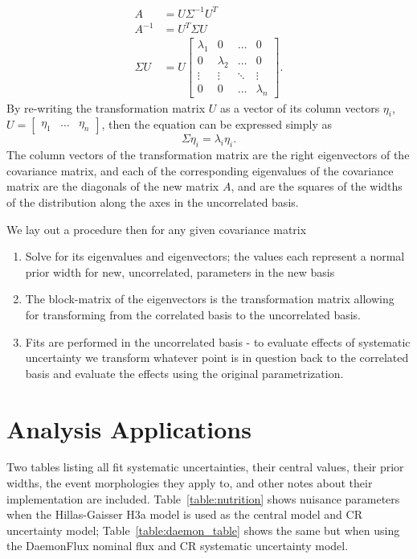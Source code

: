 \documentclass[main.tex]{subfiles}
\begin{document}
\begin{align} 
    A &= U\Sigma^{-1}U^{T}\\
    A^{-1}&= U^{T} \Sigma U \\
    \Sigma U &=  U\left[ \begin{array}{cccc}\lambda_{1} & 0 & \ldots & 0 \\
        0 & \lambda_{2} & \ldots & 0 \\
        \vdots & \vdots & \ddots & \vdots \\
        0 & 0 & \ldots & \lambda_{n} \end{array}\right].
\end{align}
By re-writing the transformation matrix $U$ as a vector of its column vectors $\eta_{i}$, $U=\left[\begin{array}{ccc}\eta_{1} & \ldots & \eta_{n} \end{array}\right]$, then the equation can be expressed simply as 
\begin{equation}
    \Sigma \eta_{i} = \lambda_{i}\eta_{i}.
\end{equation}
The column vectors of the transformation matrix are the right eigenvectors of the covariance matrix, and each of the corresponding eigenvalues of the covariance matrix are the diagonals of the new matrix $A$, and are the squares of the widths of the distribution along the axes in the uncorrelated basis. 

We lay out a procedure then for any given covariance matrix
\begin{enumerate}
    \item Solve for its eigenvalues and eigenvectors; the values each represent a normal prior width for new, uncorrelated, parameters in the new basis
    \item The block-matrix of the eigenvectors is the transformation matrix allowing for transforming from the correlated basis to the uncorrelated basis. 
    \item Fits are performed in the uncorrelated basis - to evaluate effects of systematic uncertainty we transform whatever point is in question back to the correlated basis and evaluate the effects using the original parametrization. 
\end{enumerate}

\section{Analysis Applications}\label{sec:analyis_app}


Two tables listing all fit systematic uncertainties, their central values, their prior widths, the event morphologies they apply to, and other notes about their implementation are included. Table~\ref{table:nutrition} shows nuisance parameters when the Hillas-Gaisser H3a model is used as the central model and CR uncertainty model; Table~\ref{table:daemon_table} shows the same but when using the DaemonFlux nominal flux and CR systematic uncertainty model. 
\end{document}
